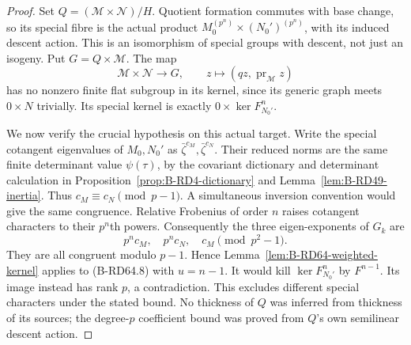 \begin{proof}
Set $Q=(\mathcal M\times\mathcal N)/H$. Quotient formation
commutes with base change, so its special fibre is the actual
product $M_0^{(p^n)}\times (N_0')^{(p^n)}$, with its induced
descent action. This is an isomorphism of special groups with
descent, not just an isogeny. Put $G=Q\times\mathcal M$.
The map
\[
 \mathcal M\times\mathcal N\longrightarrow G,
                \qquad z\longmapsto(qz,\operatorname{pr}_{\mathcal M}z)
                                                               \tag{B-RD64.8}
\]
has no nonzero finite flat subgroup in its kernel, since its
generic graph meets $0\times N$ trivially. Its special kernel
is exactly $0\times\ker F_{N_0'}^n$.

We now verify the crucial hypothesis on this actual target.
Write the special cotangent eigenvalues of $M_0,N_0'$ as
$\bar\zeta^{c_M},\bar\zeta^{c_N}$. Their reduced norms are the
same finite determinant value $\psi(\tau)$, by the covariant
dictionary and determinant calculation in
Proposition~\ref{prop:B-RD4-dictionary} and
Lemma~\ref{lem:B-RD49-inertia}. Thus
$c_M\equiv c_N\pmod{p-1}$. A simultaneous inversion convention
would give the same congruence.
Relative Frobenius of order $n$ raises cotangent characters
to their $p^n$th powers. Consequently the three eigen-exponents
of $G_k$ are
\[
                          p^n c_M,\quad p^n c_N,\quad c_M
                          \pmod{p^2-1}.
\]
They are all congruent modulo $p-1$. Hence
Lemma~\ref{lem:B-RD64-weighted-kernel} applies to (B-RD64.8)
with $u=n-1$. It would kill $\ker F_{N_0'}^n$ by $F^{n-1}$.
Its image instead has rank $p$, a contradiction. This excludes
different special characters under the stated bound. No
thickness of $Q$ was inferred from thickness of its sources;
the degree-$p$ coefficient bound was proved from $Q$'s own
semilinear descent action.
\end{proof}


